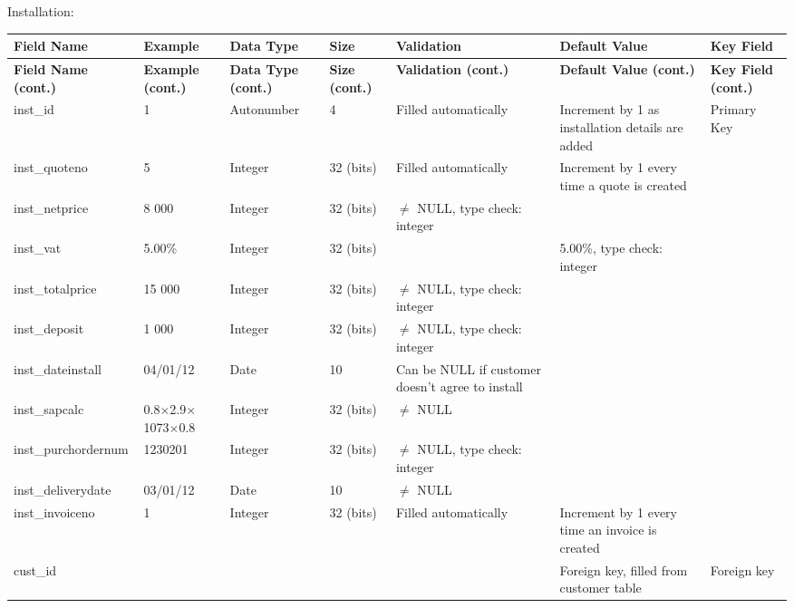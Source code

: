 Installation:

\begin{center}
	\begin{longtable}{ | p{3cm} | p{3cm} | p{2cm} | p{1cm} | p{2cm} | p{2cm} | p{2cm} | }
		\hline
		\textbf{Field Name} & \textbf{Example} & \textbf{Data Type} & \textbf{Size} & \textbf{Validation} & \textbf{Default Value} & \textbf{Key Field}\\
		\endfirsthead
		\hline
		\textbf{Field Name (cont.)} & \textbf{Example (cont.)} & \textbf{Data Type (cont.)} & \textbf{Size (cont.)} & \textbf{Validation (cont.)} & \textbf{Default Value (cont.)} & \textbf{Key Field (cont.)}\\
		\endhead
		\hline
		inst\_id & 1 & Autonumber & 4 & Filled automatically & Increment by 1 as installation details are added & Primary Key\\
		\hline
		inst\_quoteno & 5 & Integer & 32 (bits) & Filled automatically & Increment by 1 every time a quote is created &\\
		\hline
		inst\_netprice & 8 000 & Integer & 32 (bits) & $\neq$ NULL, type check: integer & &\\
		\hline
		inst\_vat & 5.00\% & Integer & 32 (bits) & & 5.00\%, type check: integer &\\
		\hline
		inst\_totalprice & 15 000 & Integer & 32 (bits) & $\neq$ NULL, type check: integer & &\\
		\hline
		inst\_deposit & 1 000 & Integer & 32 (bits) & $\neq$ NULL, type check: integer & &\\
		\hline
		inst\_dateinstall & 04\slash 01\slash 12 & Date & 10 & Can be NULL if customer doesn't agree to install & &\\
		\hline
		inst\_sapcalc & 0.8$\times$2.9$\times$1073$\times$0.8 & Integer & 32 (bits) & $\neq$ NULL & &\\
		\hline
		inst\_purchordernum & 1230201 & Integer & 32 (bits) & $\neq$ NULL, type check: integer & &\\
		\hline
		inst\_deliverydate & 03\slash 01\slash 12 & Date & 10 & $\neq$ NULL & &\\
		\hline
		inst\_invoiceno & 1 & Integer & 32 (bits) & Filled automatically & Increment by 1 every time an invoice is created &\\
		\hline
		cust\_id & & & & & Foreign key, filled from customer table & Foreign key\\
		\hline
	\end{longtable}
\end{center}

